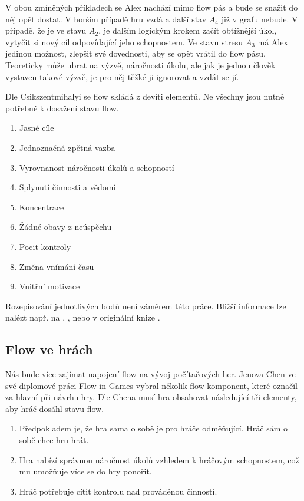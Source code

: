 V obou zmíněných příkladech se Alex nachází mimo flow pás a bude se snažit do něj opět dostat. V horším případě hru vzdá a další stav $A_4$ již v grafu nebude. V případě, že je ve stavu $A_2$, je dalším logickým krokem začít obtížnější úkol, vytyčit si nový cíl odpovídající jeho schopnostem. Ve stavu stresu $A_3$ má Alex jedinou možnost, zlepšit své dovednosti, aby se opět vrátil do flow pásu. Teoreticky může ubrat na výzvě, náročnosti úkolu, ale jak je jednou člověk vystaven takové výzvě, je pro něj těžké ji ignorovat a vzdát se jí. \cite{OptimalFun}

Dle Csikszentmihalyi se flow skládá z devíti elementů. \cite{FlowEng} Ne všechny jsou nutně potřebné k dosažení stavu flow.

\begin{enumerate}
	\item Jasné cíle
	\item Jednoznačná zpětná vazba
	\item Vyrovnanost náročnosti úkolů a schopností
	\item Splynutí činnosti a vědomí
	\item Koncentrace
	\item Žádné obavy z neúspěchu
	\item Pocit kontroly
	\item Změna vnímání času
	\item Vnitřní motivace
\end{enumerate}

Rozepisování jednotlivých bodů není záměrem této práce. Bližší informace lze nalézt např. na \cite{FlowEng}, \cite{FlowCZ}, nebo v originální knize \cite{OptimalFun}.

\subsection{Flow ve hrách}

Nás bude více zajímat napojení flow na vývoj počítačových her. Jenova Chen ve své diplomové práci Flow in Games\cite{thesisflow} vybral několik flow komponent, které označil za hlavní při návrhu hry. Dle Chena musí hra obsahovat následující tři elementy, aby hráč dosáhl stavu flow.

\begin{enumerate}
	\item Předpokladem je, že hra sama o sobě je pro hráče odměňující. Hráč sám o sobě chce hru hrát.
	\item Hra nabízí správnou náročnost úkolů vzhledem k hráčovým schopnostem, což mu umožňuje více se do hry ponořit.
	\item Hráč potřebuje cítit kontrolu nad prováděnou činností.
\end{enumerate}

